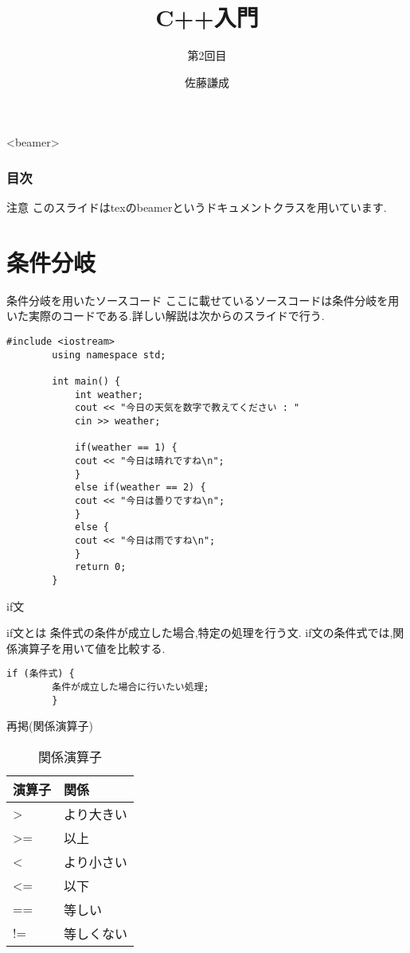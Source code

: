 \documentclass[xdvipdfmx, 8pt, t]{beamer}
\title{C++入門}
\subtitle{第2回目}
\author{佐藤謙成}
\begin{document}
\begin{frame}
    \titlepage
\end{frame}

\begin{frame}<beamer>
\frametitle{目次}
    \tableofcontents[]
\end{frame}

\begin{frame}{注意}
    このスライドはtexのbeamerというドキュメントクラスを用いています.
\end{frame}

\section{条件分岐}
\begin{frame}[fragile]{条件分岐を用いたソースコード}
    ここに載せているソースコードは条件分岐を用いた実際のコードである.詳しい解説は次からのスライドで行う.
    \tiny
    \begin{lstlisting}[caption=条件分岐を用いたコード]
        #include <iostream>
        using namespace std;

        int main() {
            int weather;
            cout << "今日の天気を数字で教えてください : "
            cin >> weather;

            if(weather == 1) {
            cout << "今日は晴れですね\n";
            }
            else if(weather == 2) {
            cout << "今日は曇りですね\n";
            }
            else {
            cout << "今日は雨ですね\n";
            }
            return 0;
        }
    \end{lstlisting}
\end{frame}
\begin{frame}[fragile]{if文}
    \begin{block}{if文とは}
        条件式の条件が成立した場合,特定の処理を行う文.
        if文の条件式では,関係演算子を用いて値を比較する.
    \end{block}
    \begin{lstlisting}[caption=if文の一般形]
        if (条件式) {
        条件が成立した場合に行いたい処理;
        }
    \end{lstlisting}
    \begin{exampleblock}{再掲(関係演算子)}
    \small
    \begin{table}[]
        \centering
        \begin{tabular}{|l|l|}
        \hline
        演算子 & 関係\\
        \hline
        > & より大きい\\
        >= & 以上\\
        < & より小さい\\
        <= & 以下\\
        == & 等しい\\
        != & 等しくない\\
        \hline
        \end{tabular}
        \caption{関係演算子}
        \label{tab:my_label}
    \end{table}
        
    \end{exampleblock}
\end{frame}
\end{document}
